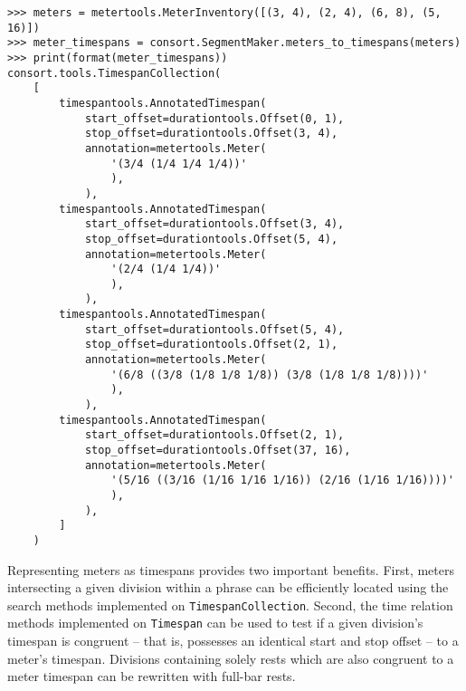 \begin{abjadbookoutput}
\begin{singlespacing}
\vspace{-0.5\baselineskip}
\begin{verbatim}
>>> meters = metertools.MeterInventory([(3, 4), (2, 4), (6, 8), (5, 16)])
>>> meter_timespans = consort.SegmentMaker.meters_to_timespans(meters)
>>> print(format(meter_timespans))
consort.tools.TimespanCollection(
    [
        timespantools.AnnotatedTimespan(
            start_offset=durationtools.Offset(0, 1),
            stop_offset=durationtools.Offset(3, 4),
            annotation=metertools.Meter(
                '(3/4 (1/4 1/4 1/4))'
                ),
            ),
        timespantools.AnnotatedTimespan(
            start_offset=durationtools.Offset(3, 4),
            stop_offset=durationtools.Offset(5, 4),
            annotation=metertools.Meter(
                '(2/4 (1/4 1/4))'
                ),
            ),
        timespantools.AnnotatedTimespan(
            start_offset=durationtools.Offset(5, 4),
            stop_offset=durationtools.Offset(2, 1),
            annotation=metertools.Meter(
                '(6/8 ((3/8 (1/8 1/8 1/8)) (3/8 (1/8 1/8 1/8))))'
                ),
            ),
        timespantools.AnnotatedTimespan(
            start_offset=durationtools.Offset(2, 1),
            stop_offset=durationtools.Offset(37, 16),
            annotation=metertools.Meter(
                '(5/16 ((3/16 (1/16 1/16 1/16)) (2/16 (1/16 1/16))))'
                ),
            ),
        ]
    )
\end{verbatim}
\end{singlespacing}
\end{abjadbookoutput}

\noindent Representing meters as timespans provides two important benefits.
First, meters intersecting a given division within a phrase can be efficiently
located using the search methods implemented on \texttt{TimespanCollection}.
Second, the time relation methods implemented on \texttt{Timespan} can be used
to test if a given division's timespan is congruent -- that is, possesses an
identical start and stop offset -- to a meter's timespan. Divisions containing
solely rests which are also congruent to a meter timespan can be rewritten with
full-bar rests.

